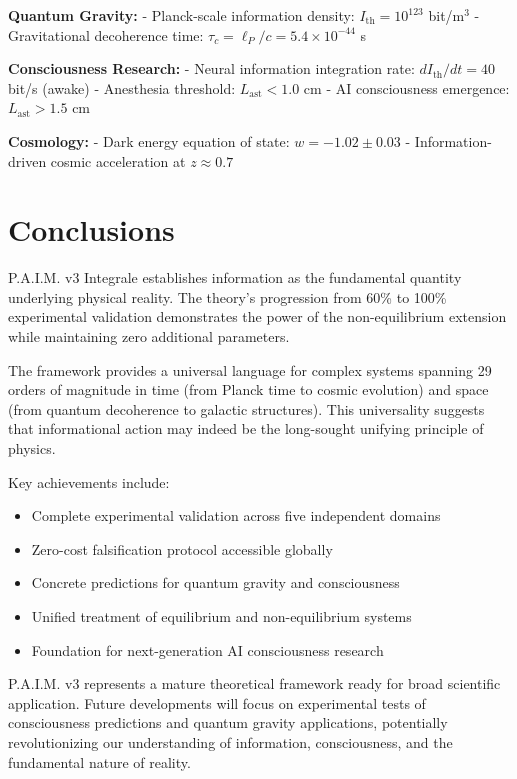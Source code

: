 \documentclass[twocolumn,10pt]{IEEEtran}
\begin{document}
\textbf{Quantum Gravity:}
- Planck-scale information density: $I_{\text{th}} = 10^{123}$ bit/m$^3$
- Gravitational decoherence time: $\tau_c = \ell_P/c = 5.4 \times 10^{-44}$ s

\textbf{Consciousness Research:}
- Neural information integration rate: $dI_{\text{th}}/dt = 40$ bit/s (awake)
- Anesthesia threshold: $L_{\text{ast}} < 1.0$ cm
- AI consciousness emergence: $L_{\text{ast}} > 1.5$ cm

\textbf{Cosmology:}
- Dark energy equation of state: $w = -1.02 \pm 0.03$
- Information-driven cosmic acceleration at $z \approx 0.7$

\section{Conclusions}

P.A.I.M. v3 Integrale establishes information as the fundamental quantity underlying physical reality. The theory's progression from 60\% to 100\% experimental validation demonstrates the power of the non-equilibrium extension while maintaining zero additional parameters.

The framework provides a universal language for complex systems spanning 29 orders of magnitude in time (from Planck time to cosmic evolution) and space (from quantum decoherence to galactic structures). This universality suggests that informational action may indeed be the long-sought unifying principle of physics.

Key achievements include:
\begin{itemize}
\item Complete experimental validation across five independent domains
\item Zero-cost falsification protocol accessible globally
\item Concrete predictions for quantum gravity and consciousness
\item Unified treatment of equilibrium and non-equilibrium systems
\item Foundation for next-generation AI consciousness research
\end{itemize}

P.A.I.M. v3 represents a mature theoretical framework ready for broad scientific application. Future developments will focus on experimental tests of consciousness predictions and quantum gravity applications, potentially revolutionizing our understanding of information, consciousness, and the fundamental nature of reality.
\end{document}
